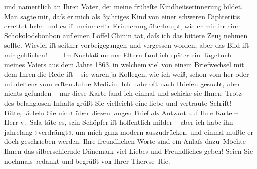 \begin{ledgroupsized}[t]{13cm}
               und namentlich an Ihren Vater,
               der meine früheſte Kindheitserinnerung bildet. Man sagte mir, daſs er mich als
               3jähriges Kind von einer schweren Diphteritis errettet habe und es iſt meine erſte
               Erinnerung überhaupt, wie er mir i{\geminationm}er eine
               Schokolodebonbon auf einen Löffel Chinin tat, daſs ich das bittere Zeug nehmen
               sollte. Wieviel iſt seither vorbeigegangen und vergessen worden, aber das Bild iſt
               mir geblieben! – – Im Nachlaß meiner Eltern fand ich später ein Tagebuch meines Vaters aus dem Jahre 1863, in
               welchem viel von \introOben{}einem Briefwechsel mit\introOben{} dem Ihren die Rede
               iſt – sie waren ja Kollegen, wie ich weiß, schon vom \label{K_L02572-4v}\label{K_L02572-4h} her oder mindeſtens vom erſten
               Jahre Medizin. Ich habe oft nach Briefen gesucht, aber nichts gefunden – nur diese
               Karte fand ich einmal und schicke sie Ihnen. Trotz {\pb}des
               belanglosen Inhalts grüßt Sie vielleicht eine liebe und vertraute Schrift! –\pend
           \pstart
           Bitte, lächeln Sie nicht über diesen langen Brief als Antwort auf Ihre Karte – Herr v. Sala täte es, sein
               Schöpfer iſt hoffentlich milder – aber ich habe ihn jahrelang »verdrängt«, um mich
               ganz modern auszudrücken, und einmal mußte er doch geschrieben werden. Ihre
               freundlichen Worte sind ein Anlaſs dazu. Möchte Ihnen das silberschi{\geminationm}ernde Dänemark viel
               Liebes und Freundliches geben! Seien Sie nochmals bedankt und begrüßt von Ihrer\pend
           \pstart \spacefill\mbox{Therese Rie.}\pend{}
         
         \endnumbering{}\end{ledgroupsized}  \newcommand{\dateiname}{L02572}\newcommand{\titel}{Therese Rie-Andro an Arthur Schnitzler, 3. 5. 1923}\newcommand{\editorInnen}{Martin Anton Müller und Gerd-Hermann Susen}
      